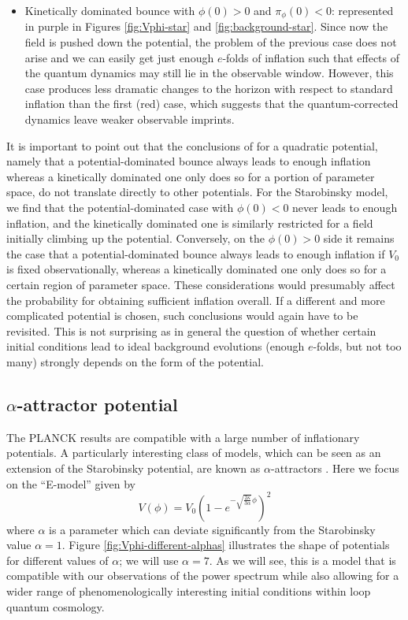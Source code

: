 \documentclass[aps,prd,11pt,showkeys,nofootinbib]{revtex4-2}
\begin{document}
\begin{itemize}
\item Kinetically dominated bounce with $\phi(0) > 0$ and $\pi_\phi(0) < 0$: represented in purple in Figures \ref{fig:Vphi-star} and \ref{fig:background-star}. Since now the field is pushed down the potential, the problem of the previous case does not arise and we can easily get just enough $e$-folds of inflation such that effects of the quantum dynamics may still lie in the observable window. However, this case produces less dramatic changes to the horizon with respect to standard inflation than the first (red) case, which suggests that the quantum-corrected dynamics leave weaker  observable imprints.

\end{itemize}

It is important to point out that the conclusions of \cite{Ashtekar:2009mm,Ashtekar:2011rm} for a quadratic potential, namely that a potential-dominated bounce always leads to enough inflation whereas a kinetically dominated one only does so for a portion of parameter space, do not translate directly to other potentials. For the Starobinsky model, we find that the potential-dominated case with $\phi(0)<0$ never leads to enough inflation, and the kinetically dominated one is similarly restricted for a field initially climbing up the potential. Conversely, on the $\phi(0)>0$ side it remains the case that a potential-dominated bounce always leads to enough inflation if $V_0$ is fixed observationally, whereas a kinetically dominated one only does so for a certain region of parameter space. These considerations would presumably affect the probability for obtaining sufficient inflation overall. If a different and more complicated potential is chosen, such conclusions would again have to be revisited. This is not surprising as in general the question of whether certain initial conditions lead to ideal background evolutions (enough $e$-folds, but not too many) strongly depends on the form of the potential.

\subsection{$\alpha$-attractor potential}

The PLANCK results are compatible with a large number of inflationary potentials. A particularly interesting class of models, which can be seen as an extension of the Starobinsky potential, are known as $\alpha$-attractors \cite{Kallosh:2013yoa,Kallosh:2015lwa}. Here we focus on the ``E-model'' given by
\begin{equation}
    V(\phi) = V_0 \left(1-e^{-\sqrt{\frac{2\kappa}{3\alpha}}\phi}\right)^2
\end{equation}
where $\alpha$ is a parameter which can deviate significantly from the Starobinsky value $\alpha=1$. Figure \ref{fig:Vphi-different-alphas} illustrates the shape of potentials for different values of $\alpha$; we will use $\alpha = 7$. As we will see, this is a model that is compatible with our observations of the power spectrum while also allowing for a wider range of phenomenologically interesting initial conditions within loop quantum cosmology.
\end{document}
